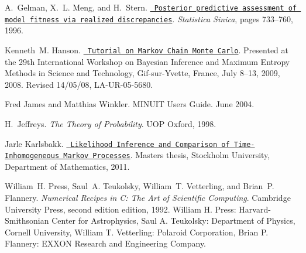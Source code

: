 \begin{DoxyDescription}
\item[\label{citelist_CITEREF_gelman1996posterior}%
\Hypertarget{citelist_CITEREF_gelman1996posterior}%
\mbox{[}8\mbox{]}]A.~Gelman, X.~L. Meng, and H.~Stern. \href{http://www.stat.columbia.edu/~gelman/research/published/A6n41.pdf}{\texttt{ Posterior predictive assessment of model fitness via realized discrepancies}}. {\itshape Statistica Sinica}, pages 733--760, 1996.


\item[\label{citelist_CITEREF_hanson2008mcmc}%
\Hypertarget{citelist_CITEREF_hanson2008mcmc}%
\mbox{[}9\mbox{]}]Kenneth~M. Hanson. \href{https://kmh-lanl.hansonhub.com/talks/maxent00b.pdf}{\texttt{ Tutorial on Markov Chain Monte Carlo}}. Presented at the 29th International Workshop on Bayesian Inference and Maximum Entropy Methods in Science and Technology, Gif-\/sur-\/\+Yvette, France, July 8–13, 2009, 2008. Revised 14/05/08, LA-\/\+UR-\/05-\/5680.


\item[\label{citelist_CITEREF_James:2004xla}%
\Hypertarget{citelist_CITEREF_James:2004xla}%
\mbox{[}10\mbox{]}]Fred James and Matthias Winkler. MINUIT User\textquotesingle{}s Guide. June 2004.


\item[\label{citelist_CITEREF_jeffreys1998theory}%
\Hypertarget{citelist_CITEREF_jeffreys1998theory}%
\mbox{[}11\mbox{]}]H.~Jeffreys. {\itshape The Theory of Probability}. UOP Oxford, 1998. 


\item[\label{citelist_CITEREF_karlsbakk2011}%
\Hypertarget{citelist_CITEREF_karlsbakk2011}%
\mbox{[}12\mbox{]}]Jarle Karlsbakk. \href{https://www2.math.su.se/matstat/reports/master/2011/rep2/report.pdf}{\texttt{ Likelihood Inference and Comparison of Time-\/\+Inhomogeneous Markov Processes}}. Master\textquotesingle{}s thesis, Stockholm University, Department of Mathematics, 2011.


\item[\label{citelist_CITEREF_press1992numerical}%
\Hypertarget{citelist_CITEREF_press1992numerical}%
\mbox{[}13\mbox{]}]William~H. Press, Saul~A. Teukolsky, William~T. Vetterling, and Brian~P. Flannery. {\itshape Numerical Recipes in C\+: The Art of Scientific Computing}. Cambridge University Press, second edition edition, 1992. William H. Press\+: Harvard-\/\+Smithsonian Center for Astrophysics, Saul A. Teukolsky\+: Department of Physics, Cornell University, William T. Vetterling\+: Polaroid Corporation, Brian P. Flannery\+: EXXON Research and Engineering Company.



\end{DoxyDescription}
